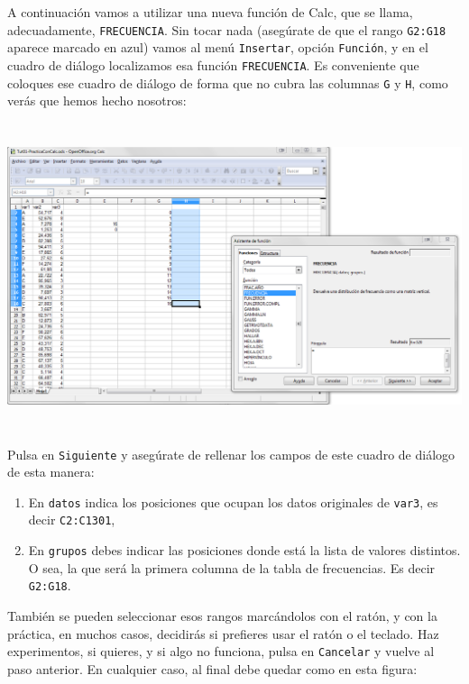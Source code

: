 \documentclass[10pt,a4paper]{article}\usepackage[]{graphicx}\usepackage[]{color}
\newcounter {cont01}
\begin{document}
A continuación vamos a utilizar una nueva función de Calc, que se llama, adecuadamente, {\tt FRECUENCIA}. Sin tocar nada (asegúrate de que el rango {\tt G2:G18} aparece marcado en azul) vamos al menú {\tt Insertar}, opción {\tt Función}, y en el cuadro de diálogo localizamos esa función {\tt FRECUENCIA}. Es conveniente que coloques ese cuadro de diálogo de forma que no cubra las columnas {\tt G} y {\tt H}, como verás que hemos hecho nosotros:
    \begin{center}
    \includegraphics[height=9cm]{../fig/Tut01-Calc-tablaFrec-14.png}
    \end{center}
Pulsa en {\tt Siguiente} y asegúrate de rellenar los campos de este cuadro de diálogo de esta manera:
\begin{enumerate}
  \item En {\tt datos} indica los posiciones que ocupan los datos originales de {\tt var3}, es decir {\tt C2:C1301},
  \item En {\tt grupos} debes indicar las posiciones donde está la lista de valores distintos. O sea, la que será la primera columna de la tabla de frecuencias.  Es decir {\tt G2:G18}.
\end{enumerate}
También se pueden seleccionar esos rangos marcándolos con el ratón, y con la práctica, en muchos casos, decidirás si prefieres usar el ratón o el teclado. Haz experimentos, si quieres, y si algo no funciona, pulsa en {\tt Cancelar} y vuelve al paso anterior. En cualquier caso, al final debe quedar como en esta figura:
\end{document}
